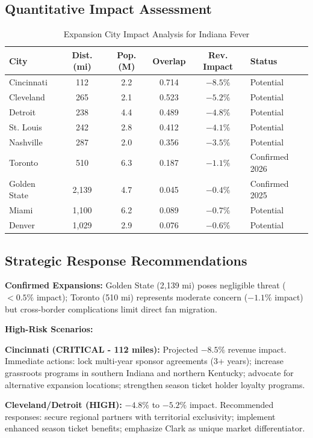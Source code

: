 \documentclass{mcmthesis}
\begin{document}
\subsection{Quantitative Impact Assessment}

\begin{table}[H]
\centering
\caption{Expansion City Impact Analysis for Indiana Fever}
\begin{tabular}{lccccl}
\toprule
\textbf{City} & \textbf{Dist. (mi)} & \textbf{Pop. (M)} & \textbf{Overlap} & \textbf{Rev. Impact} & \textbf{Status} \\
\midrule
Cincinnati & 112 & 2.2 & 0.714 & $-8.5\%$ & Potential \\
Cleveland & 265 & 2.1 & 0.523 & $-5.2\%$ & Potential \\
Detroit & 238 & 4.4 & 0.489 & $-4.8\%$ & Potential \\
St. Louis & 242 & 2.8 & 0.412 & $-4.1\%$ & Potential \\
Nashville & 287 & 2.0 & 0.356 & $-3.5\%$ & Potential \\
Toronto & 510 & 6.3 & 0.187 & $-1.1\%$ & Confirmed 2026 \\
Golden State & 2,139 & 4.7 & 0.045 & $-0.4\%$ & Confirmed 2025 \\
Miami & 1,100 & 6.2 & 0.089 & $-0.7\%$ & Potential \\
Denver & 1,029 & 2.9 & 0.076 & $-0.6\%$ & Potential \\
\bottomrule
\end{tabular}
\end{table}

\subsection{Strategic Response Recommendations}

\textbf{Confirmed Expansions:} Golden State (2,139 mi) poses negligible threat ($<0.5\%$ impact); Toronto (510 mi) represents moderate concern ($-1.1\%$ impact) but cross-border complications limit direct fan migration.

\textbf{High-Risk Scenarios:}

\textbf{Cincinnati (CRITICAL - 112 miles):} Projected $-8.5\%$ revenue impact. Immediate actions: lock multi-year sponsor agreements (3+ years); increase grassroots programs in southern Indiana and northern Kentucky; advocate for alternative expansion locations; strengthen season ticket holder loyalty programs.

\textbf{Cleveland/Detroit (HIGH):} $-4.8\%$ to $-5.2\%$ impact. Recommended responses: secure regional partners with territorial exclusivity; implement enhanced season ticket benefits; emphasize Clark as unique market differentiator.
\end{document}
